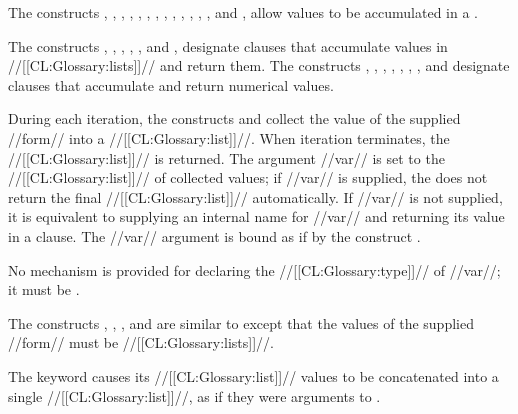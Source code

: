 The constructs , ,
, ,
, ,
, ,
, ,
, ,
, and ,
allow values to be accumulated in a .
 
 



 
The constructs , 
, , , 
, and , 
designate clauses that
accumulate values in //[[CL:Glossary:lists]]// and return them.
The constructs , , 
, , , ,
, and  designate clauses that accumulate and
return numerical values.

During each iteration,  the constructs
 and 
collect the value of the supplied
//form// into a //[[CL:Glossary:list]]//. 
When iteration terminates, the //[[CL:Glossary:list]]// is returned.
The argument //var// is 
set to the //[[CL:Glossary:list]]// 
of collected values; if //var// is supplied, the 
does not return the final //[[CL:Glossary:list]]// automatically.  If 
//var// is not
supplied, it is equivalent to supplying an internal name for
//var// and returning its value in a  clause.
The //var// argument
is bound as if by the construct .

No mechanism is provided for declaring the //[[CL:Glossary:type]]// of //var//;
it must be .
 















The constructs , , 
, and  
are similar to  except that the
values of the supplied //form// must be //[[CL:Glossary:lists]]//.  
 
\beginlist
\itemitem{\bull}
The  keyword causes its //[[CL:Glossary:list]]// values to be concatenated 
into a single //[[CL:Glossary:list]]//, as if 
they were arguments to .
 

